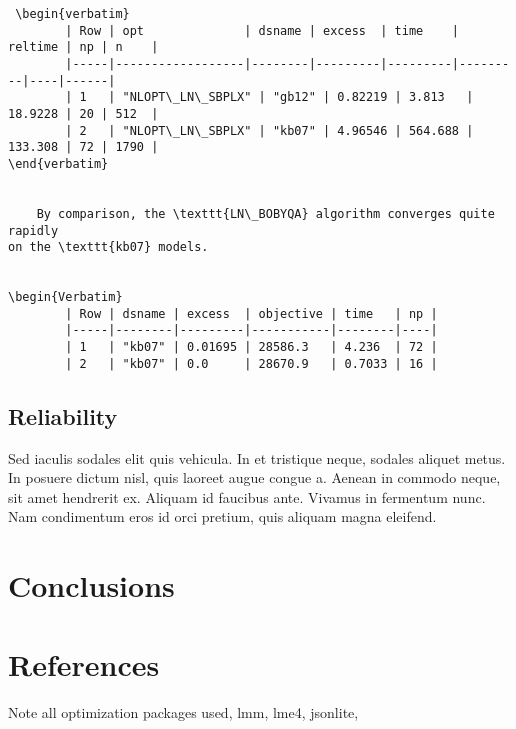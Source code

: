\documentclass[article]{jss}
\begin{document}
\begin{Verbatim}
 \begin{verbatim}
        | Row | opt              | dsname | excess  | time    | reltime | np | n    |
        |-----|------------------|--------|---------|---------|---------|----|------|
        | 1   | "NLOPT\_LN\_SBPLX" | "gb12" | 0.82219 | 3.813   | 18.9228 | 20 | 512  |
        | 2   | "NLOPT\_LN\_SBPLX" | "kb07" | 4.96546 | 564.688 | 133.308 | 72 | 1790 |
\end{verbatim}

  
    By comparison, the \texttt{LN\_BOBYQA} algorithm converges quite rapidly
on the \texttt{kb07} models.


\begin{Verbatim}
        | Row | dsname | excess  | objective | time   | np |
        |-----|--------|---------|-----------|--------|----|
        | 1   | "kb07" | 0.01695 | 28586.3   | 4.236  | 72 |
        | 2   | "kb07" | 0.0     | 28670.9   | 0.7033 | 16 |
\end{Verbatim}
        
        
        
        


\subsection[Reliablility]{Reliability}

 Sed iaculis sodales elit quis vehicula. In et tristique neque, sodales aliquet metus. In posuere dictum nisl, quis laoreet augue congue a. Aenean in commodo neque, sit amet hendrerit ex. Aliquam id faucibus ante. Vivamus in fermentum nunc. Nam condimentum eros id orci pretium, quis aliquam magna eleifend. 

\section[Conclusions]{Conclusions}

\section[References]{References}

Note all optimization packages used, lmm, lme4, jsonlite, 
\end{document}
